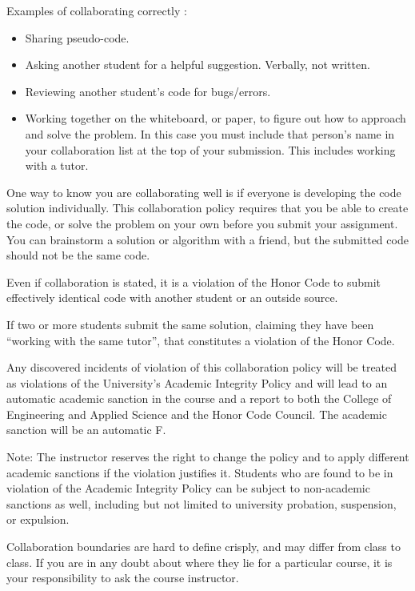 Examples of collaborating correctly :

\begin{itemize}
    \item Sharing pseudo-code.
    \item Asking another student for a helpful suggestion. Verbally, not written.
    \item Reviewing another student’s code for bugs/errors.
    \item Working together on the whiteboard, or paper, to figure out how to approach and solve the problem. In this case you must include that person’s name in your collaboration list at the top of your submission. This includes working with a tutor.
\end{itemize}

One way to know you are collaborating well is if everyone is developing the code solution individually. This collaboration policy requires that you be able to create the code, or solve the problem on your own before you submit your assignment. You can brainstorm a solution or algorithm with a friend, but the submitted code should not be the same code.

Even if collaboration is stated, it is a violation of the Honor Code to submit effectively identical code with another student or an outside source. 

If two or more students submit the same solution, claiming they have been “working with the same tutor”, that constitutes a violation of the Honor Code.

Any discovered incidents of violation of this collaboration policy will be treated as violations of the University’s Academic Integrity Policy and will lead to an automatic academic sanction in the course and a report to both the College of Engineering and Applied Science and the Honor Code Council. The academic sanction will be an automatic F.

Note: The instructor reserves the right to change the policy and to apply different academic sanctions if the violation justifies it. Students who are found to be in violation of the Academic Integrity Policy can be subject to non-academic sanctions as well, including but not limited to university probation, suspension, or expulsion.

Collaboration boundaries are hard to define crisply, and may differ from class to class. If you are in any doubt about where they lie for a particular course, it is your responsibility to ask the course instructor.

